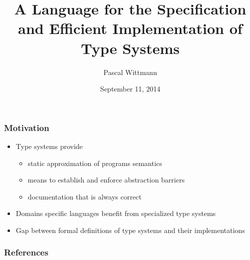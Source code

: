 \documentclass{beamer}
\title{A Language for the Specification and Efficient Implementation
  of Type Systems}
\author{Pascal Wittmann}
\institute{TU Darmstadt}
\date{September 11, 2014}
\begin{document}
\begin{frame}[plain]
  \titlepage{}
\end{frame}

\begin{frame}
  \frametitle{Motivation}
  \begin{itemize}
  \item Type systems provide
    \begin{itemize}
    \item static approximation of programs semantics
    \item means to establish and enforce abstraction barriers
    \item documentation that is always correct
    \end{itemize}
  \item Domains specific languages benefit from specialized type
    systems
  \item Gap between formal definitions of type systems and their
    implementations
  \end{itemize}
\end{frame}

\begin{frame}
  \frametitle{References}
  
  
\end{frame}
\end{document}
